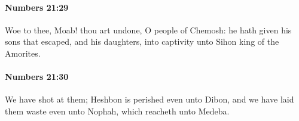 		\paragraph{Numbers 21:29} %
			\label{NUMBERS-21-29}

			Woe to thee, Moab! thou art undone, O people of Chemosh: he hath given his sons that escaped, and his daughters, into captivity unto Sihon king of the Amorites.


		\paragraph{Numbers 21:30} %
			\label{NUMBERS-21-30}

			We have shot at them; Heshbon is perished even unto Dibon, and we have laid them waste even unto Nophah, which reacheth unto Medeba.


